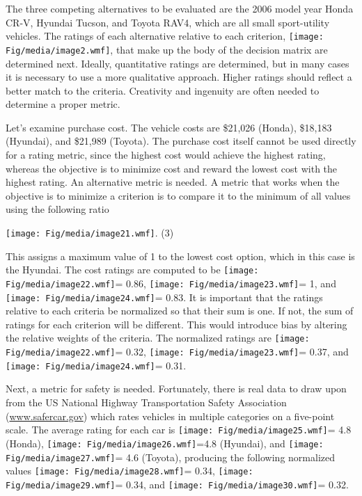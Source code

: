 The three competing alternatives to be evaluated are the 2006 model year
Honda CR-V, Hyundai Tucson, and Toyota RAV4, which are all small
sport-utility vehicles. The ratings of each alternative relative to each
criterion, \texttt{[image: Fig/media/image2.wmf]}, that make up the body
of the decision matrix are determined next. Ideally, quantitative
ratings are determined, but in many cases it is necessary to use a more
qualitative approach. Higher ratings should reflect a better match to
the criteria. Creativity and ingenuity are often needed to determine a
proper metric.

Let's examine purchase cost. The vehicle costs are \$21,026 (Honda),
\$18,183 (Hyundai), and \$21,989 (Toyota). The purchase cost itself
cannot be used directly for a rating metric, since the highest cost
would achieve the highest rating, whereas the objective is to minimize
cost and reward the lowest cost with the highest rating. An alternative
metric is needed. A metric that works when the objective is to minimize
a criterion is to compare it to the minimum of all values using the
following ratio

\texttt{[image: Fig/media/image21.wmf]}. (3)

This assigns a maximum value of 1 to the lowest cost option, which in
this case is the Hyundai. The cost ratings are computed to be
\texttt{[image: Fig/media/image22.wmf]}= 0.86,
\texttt{[image: Fig/media/image23.wmf]}= 1, and
\texttt{[image: Fig/media/image24.wmf]}= 0.83. It is important that the
ratings relative to each criteria be normalized so that their sum is
one. If not, the sum of ratings for each criterion will be different.
This would introduce bias by altering the relative weights of the
criteria. The normalized ratings are
\texttt{[image: Fig/media/image22.wmf]}= 0.32,
\texttt{[image: Fig/media/image23.wmf]}= 0.37, and
\texttt{[image: Fig/media/image24.wmf]}= 0.31.

Next, a metric for safety is needed. Fortunately, there is real data to
draw upon from the US National Highway Transportation Safety Association
(\href{http://www.safercar.gov}{www.safercar.gov}) which rates vehicles
in multiple categories on a five-point scale. The average rating for
each car is \texttt{[image: Fig/media/image25.wmf]}= 4.8 (Honda),
\texttt{[image: Fig/media/image26.wmf]}=4.8 (Hyundai), and
\texttt{[image: Fig/media/image27.wmf]}= 4.6 (Toyota), producing the
following normalized values \texttt{[image: Fig/media/image28.wmf]}=
0.34, \texttt{[image: Fig/media/image29.wmf]}= 0.34, and
\texttt{[image: Fig/media/image30.wmf]}= 0.32.

